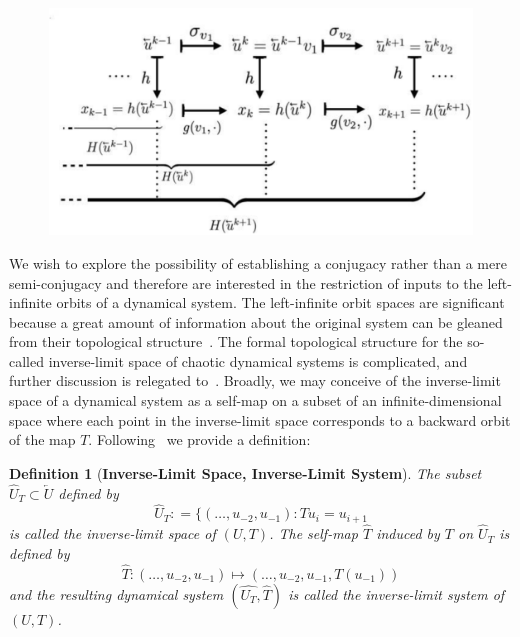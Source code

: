 \documentclass[a4paper,12pt,twoside]{report}
\newtheorem{Definition}{Definition}[]
\begin{document}
\begin{figure}[ht]
  \includegraphics[scale=0.3]{_actionofh_H.eps}
  \centering
  \label{fig:actionh_H}
\end{figure}



We wish to explore the possibility of establishing a conjugacy rather than a mere semi-conjugacy and therefore are interested in the restriction of inputs to the left-infinite orbits of a dynamical system.
The left-infinite orbit spaces are significant because a great amount of information about the original system can be gleaned from their topological structure~\cite{Manju_IEEE}. 
The formal topological structure for the so-called inverse-limit space of chaotic dynamical systems is complicated, and further discussion is relegated to~\cite{kennedy2008inverse_limit, ingram2011inverse}.
Broadly, we may conceive of the inverse-limit space of a dynamical system as a self-map on a subset of an infinite-dimensional space where each point in the inverse-limit space corresponds to a backward orbit of the map $T$. 
Following~\cite{manjunath2021universal, ingram2011inverse} we provide a definition:

\begin{Definition}
  [\bf Inverse-Limit Space, Inverse-Limit System]\label{Dfn_InverseL}\rm
 The subset $\widehat{U}_T\subset \overleftarrow{U}$ defined by \[\widehat{U}_T: = \{ (\ldots,u_{-2},u_{-1}): Tu_{i} = u_{i+1}\]is called the inverse-limit space of $(U,T)$.
 The self-map $\widehat{T}$  induced by $T$ on $\widehat{U}_T$  is defined by \[\widehat{T}: (\ldots,u_{-2},u_{-1}) \mapsto  (\ldots,u_{-2},u_{-1},T(u_{-1}))\] and the resulting dynamical system $(\widehat{U_T}, \widehat{T})$ is called the inverse-limit system of $(U,T)$.
\end{Definition}
\end{document}
